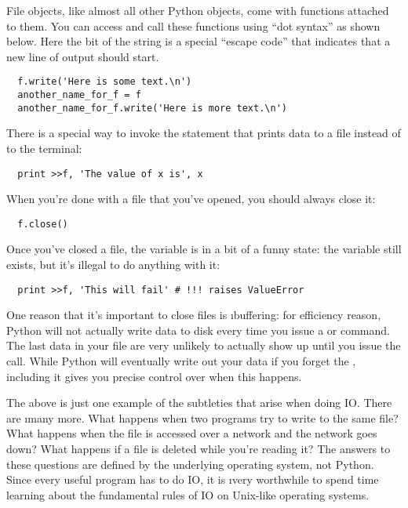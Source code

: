 \documentclass[letterpaper, 12pt, titlepage, twoside]{article}
\begin{document}
File objects, like almost all other Python objects, come with functions
attached to them. You can access and call these functions using ``dot syntax''
as shown below. Here the  bit of the string is a special
``escape code'' that indicates that a new line of output should start.

\begin{lstlisting}
  f.write('Here is some text.\n')
  another_name_for_f = f
  another_name_for_f.write('Here is more text.\n')
\end{lstlisting}

There is a special way to invoke the  statement that prints data to a
file instead of to the terminal:

\begin{lstlisting}
  print >>f, 'The value of x is', x
\end{lstlisting}

When you're done with a file that you've opened, you should always close it:

\begin{lstlisting}
  f.close()
\end{lstlisting}

Once you've closed a file, the  variable is in a bit of a funny state:
the variable still exists, but it's illegal to do anything with it:

\begin{lstlisting}
  print >>f, 'This will fail' # !!! raises ValueError
\end{lstlisting}

One reason that it's important to close files is \i{buffering}: for efficiency
reason, Python will not actually write data to disk every time you issue a
 or  command. The last data in your file are very unlikely
to actually show up until you issue the  call. While Python will
eventually write out your data if you forget the , including it
gives you precise control over when this happens.

The above is just one example of the subtleties that arise when doing IO.
There are \i{many} more. What happens when two programs try to write to the
same file? What happens when the file is accessed over a network and the
network goes down? What happens if a file is deleted while you're reading it?
The answers to these questions are defined by the underlying operating system,
not Python. Since every useful program has to do IO, it is \i{very} worthwhile
to spend time learning about the fundamental rules of IO on Unix-like
operating systems.
\end{document}
